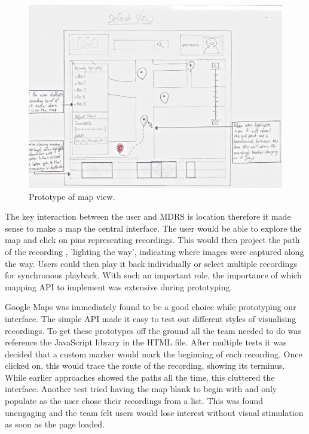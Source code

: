\documentclass{l3proj}
\begin{document}
\begin{figure}[ht!]
\centering
\includegraphics[width=1\textwidth]{images/web-map-view.jpg}
\caption{Prototype of map view.}
\end{figure}

The key interaction between the user and MDRS is location therefore it made sense to make a map the central interface. The user would be able to explore the map and click on pins representing recordings. This would then project the path of the recording , 'lighting the way', indicating where images were captured along the way. Users could then play it back individually or select multiple recordings for synchronous playback. With such an important role, the importance of which mapping \gls{API} to implement was extensive during prototyping.

Google Maps was immediately found to be a good choice while prototyping our interface. The simple API made it easy to test out different styles of visualising recordings. To get these prototypes off the ground all the team needed to do was  reference the \gls{JavaScript} library in the \gls{HTML} file. After multiple tests it was decided that a custom marker would mark the beginning of each recording. Once clicked on, this would trace the route of the recording, showing its terminus. While earlier approaches showed the paths all the time, this cluttered the interface. Another test tried having the map blank to begin with and only populate as the user chose their recordings from a list. This was found unengaging and the team felt users would lose interest without visual stimulation as soon as the page loaded.
\end{document}
